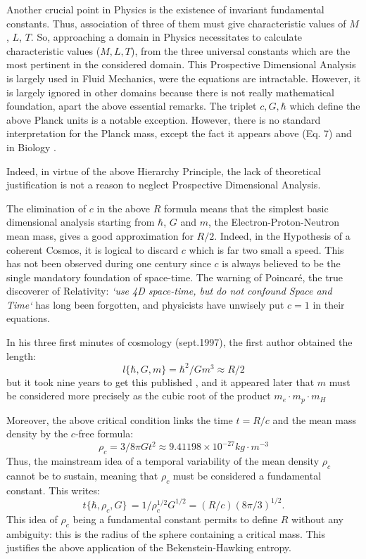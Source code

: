 \documentclass[twoside,draft]{article}
\begin{document}
\begin{sloppypar}
Another crucial point in Physics is the existence of invariant fundamental constants. Thus, association of three of them must give characteristic values of $M$, $L$, $T$. So, approaching a domain in Physics necessitates to calculate characteristic values ($M, L, T$), from the three universal constants which are the most pertinent in the considered domain. This Prospective Dimensional Analysis is largely used in Fluid Mechanics, were the equations are intractable. However, it is largely ignored in other domains because there is not really mathematical foundation, apart the above essential remarks. The triplet $c, G, \hbar$ which define the above Planck units is a notable exception. However, there is no standard interpretation for the Planck mass, except the fact it appears above (Eq. 7) and in Biology \cite{Sanchez1}. 

Indeed, in virtue of the above Hierarchy Principle, the lack of theoretical justification is not a reason to
neglect Prospective Dimensional Analysis. 

The elimination of $c$ in the above $R$ formula means that the simplest basic dimensional
analysis starting from $\hbar$, $G$ and $m$, the Electron-Proton-Neutron mean mass, gives a good
approximation for $R/2$. Indeed, in the Hypothesis of a coherent Cosmos, it is logical to discard $c$
which is far two small a speed. This has not been observed during one century since $c$ is always
believed to be the single mandatory foundation of space-time. The warning of Poincar\'{e}, the true
discoverer of Relativity: \textit{`use 4D space-time, but do not confound Space and Time`} has long been
forgotten, and physicists have unwisely put $c = 1$ in their equations.

In his three first minutes of cosmology (sept.1997), the first author obtained the length:
\begin{equation}
l \{\hbar,G,m\} = \hbar^{2} /Gm^{3} \approx R/2
\end{equation}
but it took nine years to get this published \cite{Sanchez3}, and it appeared later \cite{Sanchez1} that $m$ must be considered more precisely as the cubic root of the product 
$
m_{e} \cdot m_{p} \cdot m_{H}$

Moreover, the above critical condition
links the time $t = R/c$ and the mean mass density by the $c$-free formula:
\begin{equation}
\rho_{c} = 3/8\pi Gt^{2} \approx 9.41198 \times 10^{-27} kg \cdot m^{-3}
\end{equation}
Thus, the mainstream idea of a temporal variability of the mean density $\rho_{c}$ cannot be to
sustain, meaning that $\rho_{c}$ must be considered a fundamental constant. This writes:
\begin{equation}
t\{\hbar,\rho_{c} ,G\}\, = 1/\rho_{c}^{1/2} G^{1/2} = (R/c) (8\pi/3)^{1/2}.
\end{equation}
This idea of $\rho_{c}$ being a fundamental constant permits to define $R$ without any ambiguity: this is the 
radius of the sphere containing a critical mass. This justifies the above application of the Bekenstein-Hawking entropy. 


\end{sloppypar}
\end{document}
